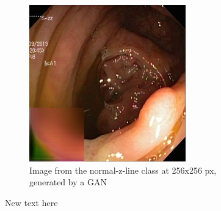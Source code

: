 \begin{figure}[t]
\begin{subfigure}[b]{0.4\textwidth}
            \includegraphics[width=\textwidth]{experiments/figures/greensquare/polypGANN.jpg}
            \caption[]%
            {{\small Image from the normal-z-line class at 256x256 px, generated by a GAN }}    
            \label{fig:zGAN}
        \end{subfigure}
        \caption[ ]
        {\small New text here} 
        \label{fig:GC1GREEN}
    \end{figure}
    
     

